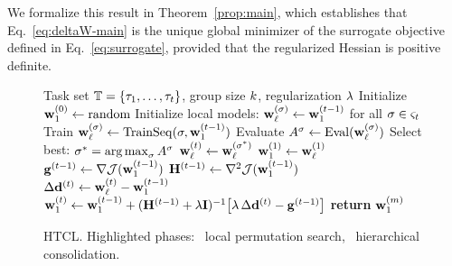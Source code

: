 We formalize this result in Theorem~\ref{prop:main}, which establishes that Eq.~\eqref{eq:deltaW-main} is the unique global minimizer of the surrogate objective defined in Eq.~\eqref{eq:surrogate}, provided that the regularized Hessian is positive definite.

\begin{figure}[!t]
  
  \begin{minipage}{1\linewidth}
    \begin{algorithm}[H]
      \small
      \caption{HTCL. Highlighted phases:
        ~local permutation search,\;
        ~hierarchical consolidation.}
      \label{alg:task-ordering}
      \begin{algorithmic}[1]
        \REQUIRE Task set $\mathbb{T} = \{\tau_1, \ldots, \tau_t\}$, group size $k$, regularization $\lambda$
        \STATE Initialize $\mathbf{w}_{1}^{(0)} \gets \text{random}$\hfill{}
            \STATE {}Initialize local models: $\mathbf{w}_{\ell}^{(\sigma)} \gets \mathbf{w}_{1}^{(t-1)}$ for all $\sigma \in \varsigma_t$
                \STATE Train $\mathbf{w}_{\ell}^{(\sigma)} \gets \mathrm{TrainSeq}(\sigma, \mathbf{w}_{1}^{(t-1)})$
                \STATE Evaluate $A^{\sigma} \gets \mathrm{Eval}(\mathbf{w}_{\ell}^{(\sigma)})$
            \ENDFOR
            \STATE Select best: $\sigma^{*} = \operatorname*{arg\,max}_{\sigma} A^{\sigma}$
            \STATE $\mathbf{w}_{\ell}^{(t)} \gets \mathbf{w}_{\ell}^{(\sigma^{*})}$
                \STATE {}$\mathbf{w}_{1}^{(1)} \gets \mathbf{w}_{\ell}^{(1)}$
            \ELSE
                \STATE $\mathbf{g}^{(t-1)} \gets \nabla \mathcal{J}(\mathbf{w}_{1}^{(t-1)})$
                \STATE $\mathbf{H}^{(t-1)} \gets \nabla^2 \mathcal{J}(\mathbf{w}_{1}^{(t-1)})$
                \STATE $\Delta\mathbf{d}^{(t)} \gets \mathbf{w}_{\ell}^{(t)} - \mathbf{w}_{1}^{(t-1)}$
                \STATE $\mathbf{w}_{1}^{(t)} \gets \mathbf{w}_{1}^{(t-1)} + (\mathbf{H}^{(t-1)} + \lambda \mathbf{I})^{-1}\!\left[\lambda\,\Delta\mathbf{d}^{(t)} - \mathbf{g}^{(t-1)}\right]$
            \ENDIF
        \ENDFOR
        \STATE \textbf{return} $\mathbf{w}_{1}^{(m)}$
      \end{algorithmic}
    \end{algorithm}
  \end{minipage}
  
\end{figure}

